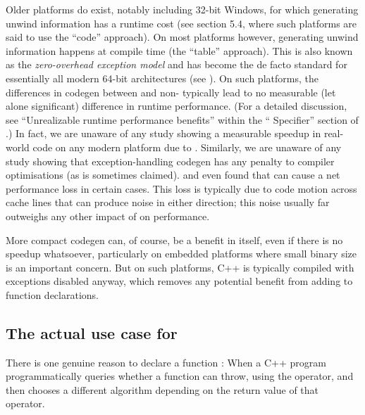 Older platforms do exist, notably including 32-bit Windows, for which generating unwind information has a runtime cost (see \cite{TR18015} section 5.4, where such platforms are said to use the ``code'' approach). On most platforms however, generating unwind information happens at compile time (the ``table'' approach). This is also known as the \emph{zero-overhead exception model} and has become the de facto standard for essentially all modern 64-bit architectures (see \cite{Mortoray2013}). On such platforms, the differences in codegen between  and non- typically lead to no measurable (let alone significant) difference in runtime performance. (For a detailed discussion, see  ``Unrealizable runtime performance benefits'' within the `` Specifier'' section of \cite{EMC++S}.) In fact, we are unaware of any study showing a measurable speedup in real-world code on any modern platform due to . Similarly, we are unaware of any study showing that exception-handling codegen has any penalty to compiler optimisations (as is sometimes claimed). \cite{Mahaffey2017} and \cite{Dekker2019} even found that  can cause a net performance loss in certain cases. This loss is typically due to code motion across cache lines that can produce noise in either direction; this noise usually far outweighs any other impact of  on performance.

More compact codegen can, of course, be a benefit in itself, even if there is no speedup whatsoever, particularly on embedded platforms where small binary size is an important concern. But on such platforms, C++ is typically compiled with exceptions disabled anyway, which removes any potential benefit from adding  to function declarations.

\subsection{The actual use case for }

There is one genuine reason to declare a function : When a C++ program programmatically queries whether a function can throw, using the  operator, and then chooses a different algorithm depending on the return value of that operator.

